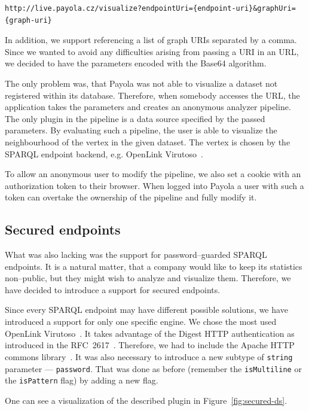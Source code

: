 {  \scriptsize
\begin{verbatim}
http://live.payola.cz/visualize?endpointUri={endpoint-uri}&graphUri={graph-uri}
\end{verbatim}
}

In addition, we support referencing a list of graph URIs separated by a comma. Since 
we wanted to avoid any difficulties arising from passing a URI in an 
URL, we decided to have the parameters encoded with the Base64 algorithm.

The only problem was, that Payola was not able to visualize a dataset not registered
within its database. Therefore, when somebody accesses the 
URL, the application takes the parameters and creates an anonymous analyzer 
pipeline. The only plugin in the pipeline is a data source specified by the 
passed parameters. By evaluating such a pipeline, the user is able to visualize 
the neighbourhood of the vertex in the given dataset. The vertex is chosen by the 
SPARQL endpoint backend, e.g. OpenLink Virutoso~\cite{virtuoso}.

To allow an anonymous user to modify the pipeline, we also set a 
cookie with an authorization token to their browser. When logged into  
Payola a user with such a token can overtake the ownership of the pipeline and 
fully modify it.

\subsection{Secured endpoints}
What was also lacking was the support for password--guarded SPARQL endpoints. 
It is a natural matter, that a company would like to keep its statistics 
non--public, but they might wish to analyze and visualize them. Therefore, we 
have decided to introduce a support for secured endpoints.

Since every SPARQL endpoint may have different possible solutions, we have 
introduced a support for only one specific engine. We chose the most
used OpenLink Virutoso~\cite{virtuoso}.
It takes advantage of the Digest HTTP authentication as introduced in the 
RFC~2617~\cite{rfc-2617}. Therefore, we had to include the Apache HTTP commons 
library~\cite{apache-http-commons}. It was also necessary to introduce a new 
subtype of \texttt{string} parameter --- \texttt{password}. That was done as 
before (remember the \texttt{isMultiline} or the \texttt{isPattern} flag) by 
adding a new flag.

One can see a visualization of the described plugin in Figure~\ref{fig:secured-ds}. 

